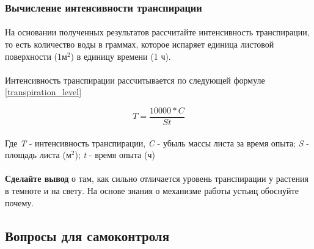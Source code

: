 \subsubsection*{Вычисление интенсивности транспирации}

\paragraph*{}На основании полученных результатов рассчитайте интенсивность транспирации, то есть количество воды в граммах, которое испаряет единица листовой поверхности (1м$^2$) в единицу времени (1 ч).

\paragraph*{}Интенсивность транспирации рассчитывается  по следующей формуле \ref{transpiration_level} 

\begin{equation}
	\label{transpiration_level}
	T = \frac{10000*C}{St}
\end{equation}

\paragraph*{}Где \textit{T} - интенсивность транспирации, \textit{C} - убыль массы листа за время опыта; \textit{S} - площадь листа (м$^2$); \textit{t} - время опыта (ч)

\paragraph*{}\textbf{Сделайте вывод} о там, как сильно отличается уровень транспирации у растения в темноте и на свету. На основе знания о механизме работы устьиц \cite{fzr_ermakov, fzr_jakushina} обоснуйте почему.

\subsection*{Вопросы для самоконтроля}

